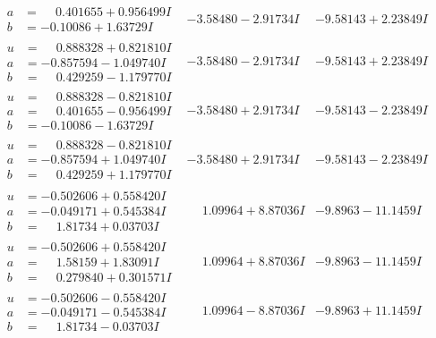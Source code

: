 \documentclass[1p]{elsarticle_modified}
\theoremstyle{definition}
\begin{document}
$$\begin{array}{c|c|c}
\begin{aligned}
a &= \phantom{-}0.401655 + 0.956499 I \\
b &= -0.10086 + 1.63729 I\end{aligned}
 & -3.58480 - 2.91734 I & -9.58143 + 2.23849 I \\ \hline\begin{aligned}
u &= \phantom{-}0.888328 + 0.821810 I \\
a &= -0.857594 - 1.049740 I \\
b &= \phantom{-}0.429259 - 1.179770 I\end{aligned}
 & -3.58480 - 2.91734 I & -9.58143 + 2.23849 I \\ \hline\begin{aligned}
u &= \phantom{-}0.888328 - 0.821810 I \\
a &= \phantom{-}0.401655 - 0.956499 I \\
b &= -0.10086 - 1.63729 I\end{aligned}
 & -3.58480 + 2.91734 I & -9.58143 - 2.23849 I \\ \hline\begin{aligned}
u &= \phantom{-}0.888328 - 0.821810 I \\
a &= -0.857594 + 1.049740 I \\
b &= \phantom{-}0.429259 + 1.179770 I\end{aligned}
 & -3.58480 + 2.91734 I & -9.58143 - 2.23849 I \\ \hline\begin{aligned}
u &= -0.502606 + 0.558420 I \\
a &= -0.049171 + 0.545384 I \\
b &= \phantom{-}1.81734 + 0.03703 I\end{aligned}
 & \phantom{-}1.09964 + 8.87036 I & -9.8963 - 11.1459 I \\ \hline\begin{aligned}
u &= -0.502606 + 0.558420 I \\
a &= \phantom{-}1.58159 + 1.83091 I \\
b &= \phantom{-}0.279840 + 0.301571 I\end{aligned}
 & \phantom{-}1.09964 + 8.87036 I & -9.8963 - 11.1459 I \\ \hline\begin{aligned}
u &= -0.502606 - 0.558420 I \\
a &= -0.049171 - 0.545384 I \\
b &= \phantom{-}1.81734 - 0.03703 I\end{aligned}
 & \phantom{-}1.09964 - 8.87036 I & -9.8963 + 11.1459 I \\ \hline\begin{aligned}

\end{aligned}
\end{array}$$
\end{document}
